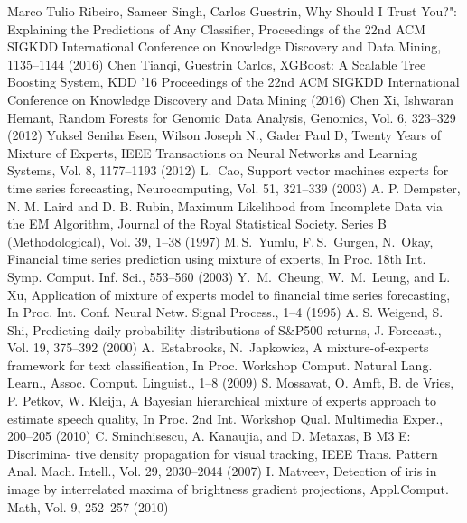 \begin{thebibliography}{}
%
%
Marco Tulio Ribeiro, Sameer Singh, Carlos Guestrin, Why Should I Trust You?": Explaining the Predictions of Any Classifier, Proceedings of the 22nd ACM SIGKDD International Conference on Knowledge Discovery and Data Mining, 1135--1144 (2016)
Chen Tianqi, Guestrin Carlos, XGBoost: A Scalable Tree Boosting System, KDD ’16 Proceedings of the 22nd ACM SIGKDD International Conference on Knowledge Discovery and Data Mining (2016)
Chen Xi, Ishwaran Hemant, Random Forests for Genomic Data Analysis, Genomics, Vol. 6, 323--329 (2012)
Yuksel Seniha Esen, Wilson Joseph N., Gader Paul D, Twenty Years of Mixture of Experts, IEEE Transactions on Neural Networks and Learning Systems, Vol. 8, 1177--1193 (2012)
L.~Cao, Support vector machines experts for time series forecasting, Neurocomputing, Vol. 51, 321--339 (2003)
A. P. Dempster, N. M. Laird and D. B. Rubin, Maximum Likelihood from Incomplete Data via the EM Algorithm, Journal of the Royal Statistical Society. Series B (Methodological), Vol. 39, 1--38 (1997)
M.\,S.~Yumlu, F.\,S.~Gurgen,  N.~Okay, Financial time series prediction using mixture of experts, In Proc. 18th Int. Symp. Comput. Inf. Sci., 553--560 (2003)
Y.~M.~Cheung, W.~M.~Leung, and L. Xu,  Application of mixture of experts model to financial time series forecasting, In Proc. Int. Conf. Neural Netw. Signal Process., 1--4 (1995)
A. S. Weigend, S. Shi, Predicting daily probability distributions of S\&P500 returns, J. Forecast., Vol. 19, 375--392 (2000)
A.~Estabrooks, N.~Japkowicz, A mixture-of-experts framework for text classification, In Proc. Workshop Comput. Natural Lang. Learn., Assoc. Comput. Linguist., 1--8 (2009)
S. Mossavat, O. Amft, B. de Vries, P. Petkov, W. Kleijn, A Bayesian hierarchical mixture of experts approach to estimate speech quality, In Proc. 2nd Int. Workshop Qual. Multimedia Exper., 200--205 (2010)
C. Sminchisescu, A. Kanaujia, and D. Metaxas, B M3 E: Discrimina- tive density propagation for visual tracking, IEEE Trans. Pattern Anal. Mach. Intell., Vol. 29, 2030--2044 (2007)
I. Matveev, Detection of iris in image by interrelated maxima of brightness gradient projections, Appl.Comput. Math, Vol. 9, 252--257 (2010)

\end{thebibliography}
